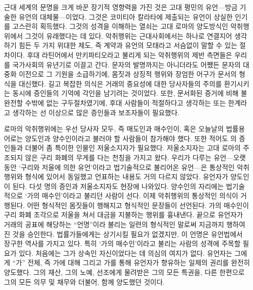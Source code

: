 근대 세계의 문명을 크게 바꾼 장기적 영향력을 가진 것은
고대 평민의 유언---방금 기술한 유언의 대체물---이었다.
그것은 코미티아 칼라타에 제출되는 유언이 상실한 인기를 고스란히 획득했다.
그것의 성격을 이해하는 열쇠는
고대 로마의 양도방식인
악취행위에서
그것이
유래했다는 데 있다.
악취행위는 근대사회에서는 하나로 연결지어 생각하기 힘든
두 가지 위대한 제도, 즉 계약과 유언의 모태라고 서슴없이 말할 수 있는 절차이다.
후대 라틴어에서 만키파티오라고 불리게 되는
악취행위의 제반 측면들은 우리를 국가사회의 유년기로 이끌고 간다.
문자의 발명까지는 아니더라도 어쨌든 문자의 대중화 이전으로
그 기원을 소급하기에,
몸짓과 상징적 행위와 장엄한 어구가 문서의 형식을 대신했다.
길고 복잡한 의식은 거래의 중요성에 대한
당사자들의 주의를 환기시키는 동시에 증인들의 기억에 각인을 남기려는 것이었다.
또한, 문서화된 증거에 비해 불완전할 수밖에 없는 구두절차였기에,
후대 사람들이 적절하다고 생각하는 또는 한계라고 생각하는 선 이상으로 많은
증인들과 보조자들이 필요했다.

로마의 악취행위에는 우선 당사자 모두, 즉 매도인과 매수인이,
혹은 오늘날의 법률용어로는 양도인과 양수인이라고 불러야 할 사람들이
참가해야 했다.
또한 적어도 의 증인들과 더불어 좀 특이한 인물인
저울소지자가 필요했다.
저울소지자는 고대 로마의 주조되지 않은 구리 화폐의 무게를 다는
천칭을 가지고 왔다.
우리가 다루는 유언---오랫동안
`구리와 저울에 의한 유언'이라고
법기술적으로 불리어온 유언---은
통상적인 악취행위와 형식에 있어서 동일했고
언표하는 내용도 거의 다르지 않았다.
유언자가 양도인이 된다.
다섯 명의 증인과 저울소지자도 현장에 나와있다.
양수인의 자리에는 법기술적으로
`가의 매수인'이라고 불리던 사람이 선다.
이제 악취행위의 통상적인 의식이 거행된다.
어떤 형식적인 몸짓들이 행해지고 형식적인 문장들이 선언된다.
가의 매수인이
구리 화폐 조각으로 저울을 쳐서 대금을 지불하는 행위를 흉내낸다.
끝으로 유언자가
거래의 공표에 해당하는 ``언명''이라
불리는 일련의 형식적인 말로써 지금까지 행하여진 것을 승인한다.
법률가들에게는 상기시킬 필요가 없겠지만, 이 언명은
유언법에서 장구한 역사를 가지고 있다.
특히 `가의 매수인'이라고 불리는 사람의 성격에 주목할 필요가 있다.
처음에는 그가 상속인 자신이었다는 데 의심의 여지가 없다.
유언자는 그에게 ``가'' 전체, 즉
가에 대해 그리고 가를 통해 유언자가 향유하는 일체의 권리를 완전히 양도했다.
그의 재산, 그의 노예, 선조에게 물려받은 그의 모든 특권을,
다른 한편으로 그의 모든 의무 및 채무와 더불어, 함께 양도했던 것이다.


